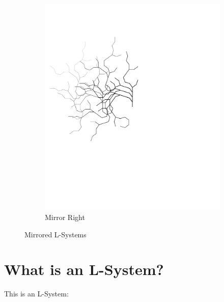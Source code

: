 \documentclass[12pt,twoside]{reedthesis}
\begin{document}
\begin{figure}[h]
\begin{subfigure}{0.5\textwidth}
		\includegraphics[clip=true, viewport=0in 3.5in 6in 10in, scale = 0.5]{Images/ThePathWeWillFollow4B}
		\caption[Mirror Right]{Mirror Right\footnotemark}	
		\label {MirrorRight}
	\end{subfigure}
	\caption[Mirrored L-Systems]{Mirrored L-Systems}
	\label{Same}
	\end{figure}
	
	\addtocounter{footnote}{-1}
	\addtocounter{footnote}{1}

	

	
	
\chapter{What is an L-System?}

This is an L-System:
\end{document}
